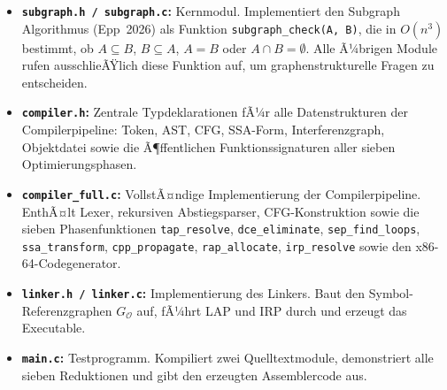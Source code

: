 ﻿\documentclass[a4paper,12pt]{article}
\theoremstyle{definition}
\begin{document}
\begin{center}
\end{center}

\begin{itemize}
	\item \textbf{\texttt{subgraph.h / subgraph.c}:}
	Kernmodul. Implementiert den Subgraph Algorithmus (Epp~2026) als
	Funktion \texttt{subgraph\_check(A, B)}, die in $O(n^3)$ bestimmt,
	ob $A \subseteq B$, $B \subseteq A$, $A = B$ oder $A \cap B =
	\emptyset$. Alle Ã¼brigen Module rufen ausschlieÃŸlich diese Funktion
	auf, um graphenstrukturelle Fragen zu entscheiden.
	\item \textbf{\texttt{compiler.h}:}
	Zentrale Typdeklarationen fÃ¼r alle Datenstrukturen der
	Compilerpipeline: Token, AST, CFG, SSA-Form, Interferenzgraph,
	Objektdatei sowie die Ã¶ffentlichen Funktionssignaturen aller
	sieben Optimierungsphasen.
	\item \textbf{\texttt{compiler\_full.c}:}
	VollstÃ¤ndige Implementierung der Compilerpipeline. EnthÃ¤lt Lexer,
	rekursiven Abstiegsparser, CFG-Konstruktion sowie die sieben
	Phasenfunktionen \texttt{tap\_resolve}, \texttt{dce\_eliminate},
	\texttt{sep\_find\_loops}, \texttt{ssa\_transform},
	\texttt{cpp\_propagate}, \texttt{rap\newline \_allocate},
	\texttt{irp\_resolve} sowie den x86-64-Codegenerator.
	\item \textbf{\texttt{linker.h / linker.c}:}
	Implementierung des Linkers. Baut den Symbol-Referenz\-graphen
	$G_{\mathcal{O}}$ auf, fÃ¼hrt LAP und IRP durch und erzeugt das
	Executable.
	\item \textbf{\texttt{main.c}:}
	Testprogramm. Kompiliert zwei Quelltextmodule, demonstriert alle
	sieben Reduktionen und gibt den erzeugten Assemblercode aus.
\end{itemize}
\end{document}
